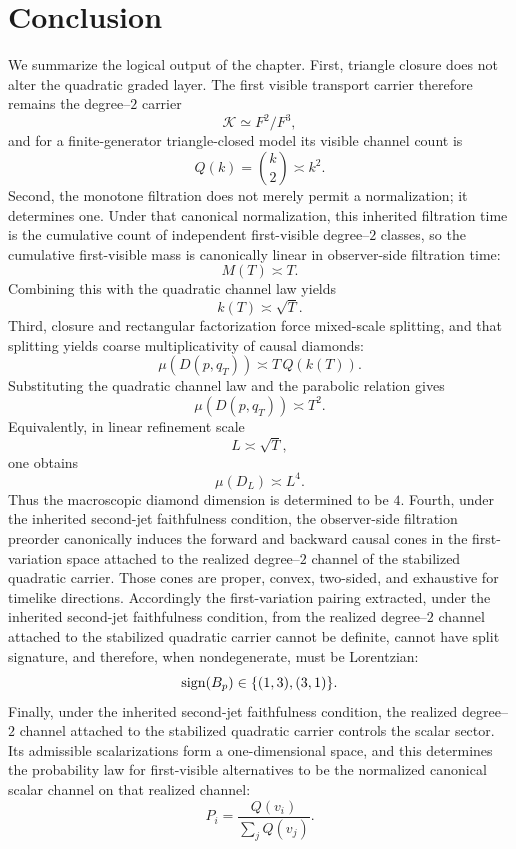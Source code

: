 \section{Conclusion}
\label{sec:causality-conclusion}
We summarize the logical output of the chapter.
First, triangle closure does not alter the quadratic graded layer.
The first visible transport carrier therefore remains the degree--\(2\)
carrier
\[
	\mathcal K \simeq F^2/F^3,
\]
and for a finite-generator triangle-closed model its visible channel
count is
\[
	Q(k)=\binom{k}{2}\asymp k^2.
\]
Second, the monotone filtration does not merely permit a normalization;
it determines one.  Under that canonical normalization, this inherited
filtration time is the cumulative count of independent first-visible
degree--\(2\) classes, so the cumulative first-visible mass is
canonically linear in observer-side filtration time:
\[
	M(T)\asymp T.
\]
Combining this with the quadratic channel law yields
\[
	k(T)\asymp \sqrt T.
\]
Third, closure and rectangular factorization force mixed-scale
splitting, and that splitting yields coarse multiplicativity of causal
diamonds:
\[
	\mu(D(p,q_T))\asymp T\,Q(k(T)).
\]
Substituting the quadratic channel law and the parabolic relation gives
\[
	\mu(D(p,q_T))\asymp T^2.
\]
Equivalently, in linear refinement scale
\[
	L\asymp \sqrt T,
\]
one obtains
\[
	\mu(D_L)\asymp L^4.
\]
Thus the macroscopic diamond dimension is determined to be \(4\).
Fourth, under the inherited second-jet faithfulness condition, the
observer-side filtration preorder canonically induces the forward
and backward causal cones in the first-variation space attached to
the realized degree--\(2\) channel of the stabilized quadratic
carrier.  Those cones are proper, convex, two-sided, and exhaustive
for timelike directions.
Accordingly the first-variation pairing extracted, under the
inherited second-jet faithfulness condition, from the realized
degree--\(2\) channel attached to the stabilized quadratic carrier
cannot be definite, cannot have split signature, and therefore, when
nondegenerate, must be Lorentzian:
\[
	\operatorname{sign}(B_p)\in\{(1,3),(3,1)\}.
\]
Finally, under the inherited second-jet faithfulness condition, the
realized degree--\(2\) channel attached to the stabilized quadratic
carrier controls the scalar sector.  Its admissible scalarizations
form a one-dimensional space, and this determines the probability
law for first-visible alternatives to be the normalized canonical
scalar channel on that realized channel:
\[
	P_i=\frac{Q(v_i)}{\sum_j Q(v_j)}.
\]
